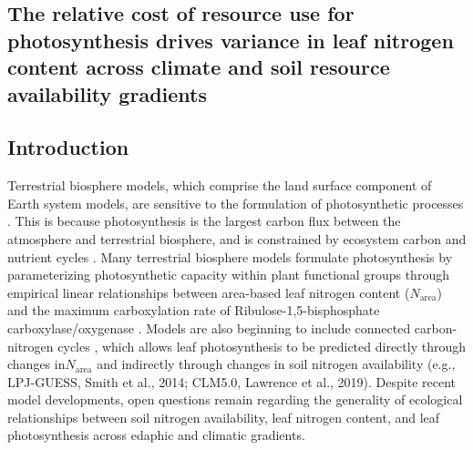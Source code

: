 \begin{singlespace}
    \chapter{\textbf{The relative cost of resource use for photosynthesis drives variance in leaf nitrogen content across climate and soil resource availability gradients}}
    \end{singlespace}
    
    \section{Introduction}

Terrestrial biosphere models, which comprise the land surface component of Earth system models, are sensitive to the formulation of photosynthetic processes . This is because photosynthesis is the largest carbon flux between the atmosphere and terrestrial biosphere, and is constrained by ecosystem carbon and nutrient cycles . Many terrestrial biosphere models formulate photosynthesis by parameterizing photosynthetic capacity within plant functional groups through empirical linear relationships between area-based leaf nitrogen content ($N_{\mathrm{area}}$) and the maximum carboxylation rate of Ribulose-1,5-bisphosphate carboxylase/oxygenase . Models are also beginning to include connected carbon-nitrogen cycles , which allows leaf photosynthesis to be predicted directly through changes in$N_{\mathrm{area}}$ and indirectly through changes in soil nitrogen availability (e.g., LPJ-GUESS, Smith et al., 2014; CLM5.0, Lawrence et al., 2019). Despite recent model developments, open questions remain regarding the generality of ecological relationships between soil nitrogen availability, leaf nitrogen content, and leaf photosynthesis across edaphic and climatic gradients.